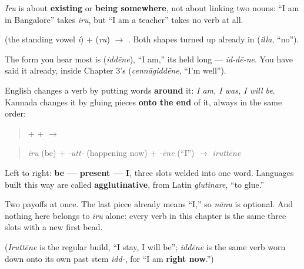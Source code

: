 \emph{Iru} is about \textbf{existing} or \textbf{being somewhere}, not about linking two nouns: \textquotedblleft{}I am in Bangalore\textquotedblright{} takes \emph{iru}, but \textquotedblleft{}I am a teacher\textquotedblright{} takes no verb at all.

\begin{sounds}
\textbf{} (the standing vowel \emph{i}) + \textbf{} (\emph{ru}) $\to$ \textbf{}. Both shapes turned up already in \textbf{} (\emph{illa}, \textquotedblleft{}no\textquotedblright{}).

The form you hear most is \textbf{} (\emph{iddēne}), \textquotedblleft{}I am,\textquotedblright{} its \textbf{} held long — \emph{id-dē-ne}. You have said it already, inside Chapter 3's \textbf{} (\emph{cennāgiddēne}, \textquotedblleft{}I'm well\textquotedblright{}).
\end{sounds}

\begin{grammarlens}[title={Grammar Lens: stem, then tense, then person}]
English changes a verb by putting words \textbf{around} it: \emph{I am, I was, I will be}. Kannada changes it by gluing pieces \textbf{onto the end} of it, always in the same order:

\begin{quote}
\textbf{} + \textbf{} + \textbf{} $\to$ \textbf{}
\end{quote}

\begin{quote}
\emph{iru} (be) + \emph{-utt-} (happening now) + \emph{-ēne} (\textquotedblleft{}I\textquotedblright{}) $\to$ \emph{iruttēne}
\end{quote}

Left to right: \textbf{be — present — I}, three slots welded into one word. Languages built this way are called \textbf{agglutinative}, from Latin \emph{glutinare}, \textquotedblleft{}to glue.\textquotedblright{}

Two payoffs at once. The last piece already means \textquotedblleft{}I,\textquotedblright{} so \emph{nānu} is optional. And nothing here belongs to \emph{iru} alone: every verb in this chapter is the same three slots with a new first bead.

(\emph{Iruttēne} is the regular build, \textquotedblleft{}I stay, I will be\textquotedblright{}; \emph{iddēne} is the same verb worn down onto its own past stem \emph{idd-}, for \textquotedblleft{}I am \textbf{right now}.\textquotedblright{})
\end{grammarlens}


